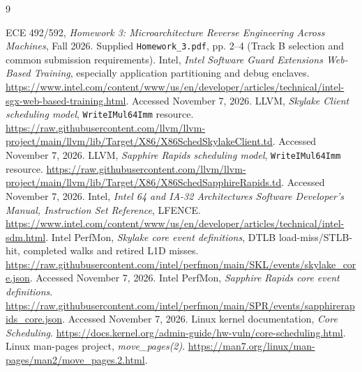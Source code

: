 \documentclass[11pt,letterpaper]{article}
\begin{document}
\begin{thebibliography}{9}\small\raggedright
{} ECE 492/592, \emph{Homework 3: Microarchitecture Reverse Engineering Across Machines}, Fall 2026. Supplied \texttt{Homework\_3.pdf}, pp. 2--4 (Track B selection and common submission requirements).
 Intel, \emph{Intel Software Guard Extensions Web-Based Training}, especially application partitioning and debug enclaves. \url{https://www.intel.com/content/www/us/en/developer/articles/technical/intel-sgx-web-based-training.html}. Accessed November 7, 2026.
 LLVM, \emph{Skylake Client scheduling model}, \texttt{WriteIMul64Imm} resource. \url{https://raw.githubusercontent.com/llvm/llvm-project/main/llvm/lib/Target/X86/X86SchedSkylakeClient.td}. Accessed November 7, 2026.
 LLVM, \emph{Sapphire Rapids scheduling model}, \texttt{WriteIMul64Imm} resource. \url{https://raw.githubusercontent.com/llvm/llvm-project/main/llvm/lib/Target/X86/X86SchedSapphireRapids.td}. Accessed November 7, 2026.
 Intel, \emph{Intel 64 and IA-32 Architectures Software Developer's Manual, Instruction Set Reference}, LFENCE. \url{https://www.intel.com/content/www/us/en/developer/articles/technical/intel-sdm.html}.
 Intel PerfMon, \emph{Skylake core event definitions}, DTLB load-miss/STLB-hit, completed walks and retired L1D misses. \url{https://raw.githubusercontent.com/intel/perfmon/main/SKL/events/skylake_core.json}. Accessed November 7, 2026.
 Intel PerfMon, \emph{Sapphire Rapids core event definitions}. \url{https://raw.githubusercontent.com/intel/perfmon/main/SPR/events/sapphirerapids_core.json}. Accessed November 7, 2026.
 Linux kernel documentation, \emph{Core Scheduling}. \url{https://docs.kernel.org/admin-guide/hw-vuln/core-scheduling.html}.
 Linux man-pages project, \emph{move\_pages(2)}. \url{https://man7.org/linux/man-pages/man2/move_pages.2.html}.
\end{thebibliography}
\end{document}
